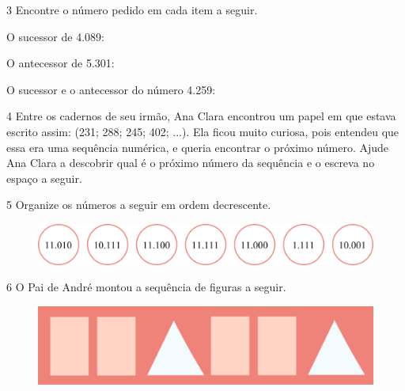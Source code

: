 \num{3} Encontre o número pedido em cada item a seguir.

\begin{escolha}
\item
  O sucessor de 4.089: 

\item
  O antecessor de 5.301: 

\item
  O sucessor e o antecessor do número 4.259: 
\end{escolha}


\num{4} Entre os cadernos de seu irmão, Ana Clara encontrou um papel em que estava escrito assim: (231; 288; 245; 402; ...). Ela ficou muito curiosa, pois entendeu que essa era uma sequência
numérica, e queria encontrar o próximo número. Ajude Ana Clara a descobrir qual é o próximo número da sequência e o escreva no espaço a seguir.

\begin{mdframed}[linewidth=2pt,linecolor=salmao,roundcorner=2pt]
\vspace{4.5cm}
\end{mdframed}

\pagebreak
\num{5} Organize os números a seguir em ordem decrescente.

\begin{figure}[htpb!]
\centering
\includegraphics[width=\textwidth]{media/image18.png}
\end{figure}

\begin{mdframed}[linewidth=2pt,linecolor=salmao,roundcorner=2pt]
\end{mdframed}

\num{6} O Pai de André montou a sequência de figuras a seguir.

\begin{figure}[htpb!]
\centering
\includegraphics[width=\textwidth]{media/image19.png}
\end{figure}

